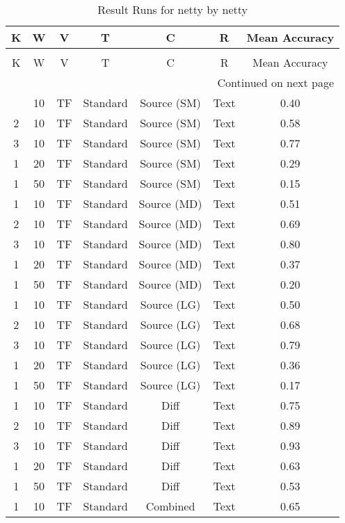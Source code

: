 \begin{longtable}{|c|c|c|c|c|c|c|}
\hline
K & W & V & T & C & R & Mean Accuracy \\
\hline
\endfirsthead
\caption[]{Continued from previous page} \\
\hline
K & W & V & T & C & R & Mean Accuracy \\
\hline
\endhead
\hline
\multicolumn{7}{r}{Continued on next page} \\
\endfoot
\hline
\caption{Result Runs for netty by netty} 
\label{result-runs-netty-netty}
\endlastfoot
1 & 10 & TF & Standard & Source (SM) & Text & 0.40 \\
\hline
2 & 10 & TF & Standard & Source (SM) & Text & 0.58 \\
\hline
3 & 10 & TF & Standard & Source (SM) & Text & 0.77 \\
\hline
1 & 20 & TF & Standard & Source (SM) & Text & 0.29 \\
\hline
1 & 50 & TF & Standard & Source (SM) & Text & 0.15 \\
\hline
1 & 10 & TF & Standard & Source (MD) & Text & 0.51 \\
\hline
2 & 10 & TF & Standard & Source (MD) & Text & 0.69 \\
\hline
3 & 10 & TF & Standard & Source (MD) & Text & 0.80 \\
\hline
1 & 20 & TF & Standard & Source (MD) & Text & 0.37 \\
\hline
1 & 50 & TF & Standard & Source (MD) & Text & 0.20 \\
\hline
1 & 10 & TF & Standard & Source (LG) & Text & 0.50 \\
\hline
2 & 10 & TF & Standard & Source (LG) & Text & 0.68 \\
\hline
3 & 10 & TF & Standard & Source (LG) & Text & 0.79 \\
\hline
1 & 20 & TF & Standard & Source (LG) & Text & 0.36 \\
\hline
1 & 50 & TF & Standard & Source (LG) & Text & 0.17 \\
\hline
1 & 10 & TF & Standard & Diff & Text & 0.75 \\
\hline
2 & 10 & TF & Standard & Diff & Text & 0.89 \\
\hline
3 & 10 & TF & Standard & Diff & Text & 0.93 \\
\hline
1 & 20 & TF & Standard & Diff & Text & 0.63 \\
\hline
1 & 50 & TF & Standard & Diff & Text & 0.53 \\
\hline
1 & 10 & TF & Standard & Combined & Text & 0.65 \\

\end{longtable}
